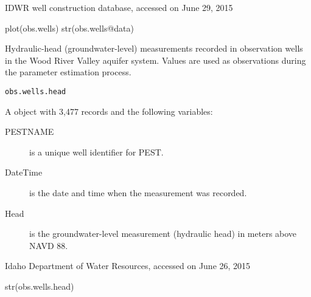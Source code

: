 \documentclass[letterpaper]{book}
\begin{document}
%
\begin{Source}\relax
IDWR well construction database, accessed on June 29, 2015
\end{Source}
%
\begin{SeeAlso}\relax
{}
\end{SeeAlso}
%
\begin{Examples}
\begin{ExampleCode}
plot(obs.wells)
str(obs.wells@data)
\end{ExampleCode}
\end{Examples}
%
\begin{Description}\relax
Hydraulic-head (groundwater-level) measurements recorded in observation wells in the Wood River Valley aquifer system.
Values are used as observations during the parameter estimation process.
\end{Description}
%
\begin{Usage}
\begin{verbatim}
obs.wells.head
\end{verbatim}
\end{Usage}
%
\begin{Format}
A  object with 3,477 records and the following variables:
\begin{description}

\item[PESTNAME] is a unique well identifier for PEST.
\item[DateTime] is the date and time when the measurement was recorded.
\item[Head] is the groundwater-level measurement (hydraulic head) in meters above NAVD 88.

\end{description}

\end{Format}
%
\begin{Source}\relax
Idaho Department of Water Resources, accessed on June 26, 2015
\end{Source}
%
\begin{SeeAlso}\relax
{}
\end{SeeAlso}
%
\begin{Examples}
\begin{ExampleCode}
str(obs.wells.head)
\end{ExampleCode}
\end{Examples}
\end{document}
